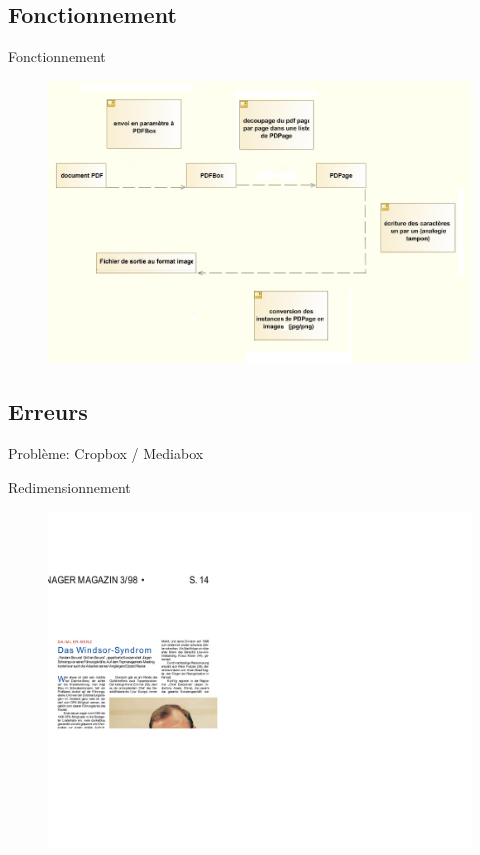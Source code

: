 \subsection{Fonctionnement}
\begin{frame}{Fonctionnement}
		\begin{figure}[h]
			\begin{center}
 			\includegraphics[scale=0.30]{images/pdfboxTraitement.png} 
			\end{center}
    		\end{figure}
\end{frame}

\subsection{Erreurs}
\begin{frame}{Problème: Cropbox / Mediabox}
	\begin{block}{Redimensionnement}
		\begin{figure}[h]
        		\begin{center}
         		\includegraphics[scale=0.08]{images/fail1.jpg} 
        		\end{center}
    		\end{figure}
	\end{block}
\end{frame}

